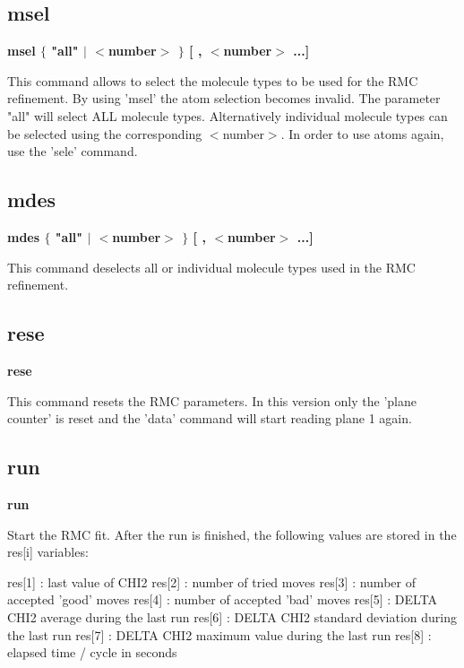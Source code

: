 \subsection*{msel}
{\bf msel $ \{$ "all" $| $ $ <$number$> $ $\} $ [ , $ <$number$> $ ...] \par }
\par
\vspace{3pt}
This command allows to select the molecule types to be used for 
the RMC refinement. By using 'msel' the atom selection becomes 
invalid. The parameter "all" will select ALL molecule types. 
Alternatively individual molecule types can be selected using the 
corresponding $ <$number$> $. In order to use atoms again, use the 'sele' 
command. 
\subsection*{mdes}
{\bf mdes $ \{$ "all" $| $ $ <$number$> $ $\} $ [ , $ <$number$> $ ...] \par }
\par
\vspace{3pt}
This command deselects all or individual molecule types used in 
the RMC refinement. 
\subsection*{rese}
{\bf rese \par }
\par
\vspace{3pt}
This command resets the RMC parameters. In this version only the 
'plane counter' is reset and the 'data' command will start reading 
plane 1 again. 
\subsection*{run}
{\bf run \par }
\par
\vspace{3pt}
Start the RMC fit. After the run is finished, the following values 
are stored in the res[i] variables: 
\par
\begin{MacVerbatim}
res[1] : last value of CHI2
res[2] : number of tried moves
res[3] : number of accepted 'good' moves
res[4] : number of accepted 'bad' moves
res[5] : DELTA CHI2 average during the last run
res[6] : DELTA CHI2 standard deviation during the last run
res[7] : DELTA CHI2 maximum value during the last run
res[8] : elapsed time / cycle in seconds
\end{MacVerbatim}

